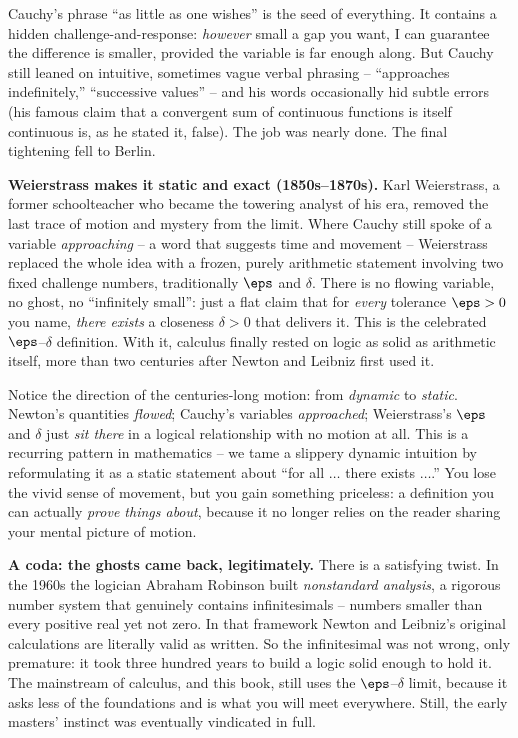 Cauchy's phrase ``as little as one wishes'' is the seed of everything. It contains a hidden
challenge-and-response: \emph{however} small a gap you want, I can guarantee the difference is
smaller, provided the variable is far enough along. But Cauchy still leaned on intuitive,
sometimes vague verbal phrasing -- ``approaches indefinitely,'' ``successive values'' -- and his
words occasionally hid subtle errors (his famous claim that a convergent sum of continuous
functions is itself continuous is, as he stated it, false). The job was nearly done. The final
tightening fell to Berlin.

\begin{historybox}
\textbf{Weierstrass makes it static and exact (1850s--1870s).} Karl Weierstrass, a former
schoolteacher who became the towering analyst of his era, removed the last trace of motion and
mystery from the limit. Where Cauchy still spoke of a variable \emph{approaching} -- a word that
suggests time and movement -- Weierstrass replaced the whole idea with a frozen, purely
arithmetic statement involving two fixed challenge numbers, traditionally $\eps$ and $\delta$.
There is no flowing variable, no ghost, no ``infinitely small'': just a flat claim that for
\emph{every} tolerance $\eps>0$ you name, \emph{there exists} a closeness $\delta>0$ that
delivers it. This is the celebrated $\eps$--$\delta$ definition. With it, calculus finally rested
on logic as solid as arithmetic itself, more than two centuries after Newton and Leibniz first
used it.
\end{historybox}

\begin{aestheticbox}
Notice the direction of the centuries-long motion: from \emph{dynamic} to \emph{static}. Newton's
quantities \emph{flowed}; Cauchy's variables \emph{approached}; Weierstrass's $\eps$ and $\delta$
just \emph{sit there} in a logical relationship with no motion at all. This is a recurring pattern
in mathematics -- we tame a slippery dynamic intuition by reformulating it as a static statement
about ``for all $\dots$ there exists $\dots$.'' You lose the vivid sense of movement, but you gain
something priceless: a definition you can actually \emph{prove things about}, because it no longer
relies on the reader sharing your mental picture of motion.
\end{aestheticbox}

\begin{historybox}
\textbf{A coda: the ghosts came back, legitimately.} There is a satisfying twist. In the 1960s
the logician Abraham Robinson built \emph{nonstandard analysis}, a rigorous number system that
genuinely contains infinitesimals -- numbers smaller than every positive real yet not zero. In
that framework Newton and Leibniz's original calculations are literally valid as written. So the
infinitesimal was not wrong, only premature: it took three hundred years to build a logic
solid enough to hold it. The mainstream of calculus, and this book, still uses the
$\eps$--$\delta$ limit, because it asks less of the foundations and is what you will meet
everywhere. Still, the early masters' instinct was eventually vindicated
in full.
\end{historybox}

